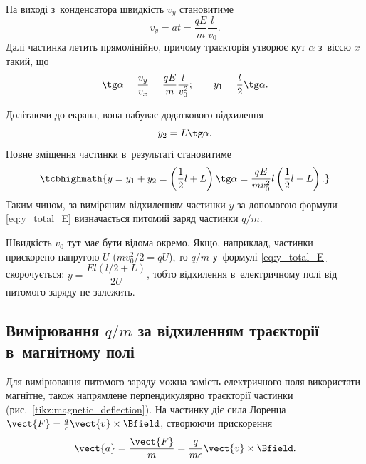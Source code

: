 На виході з~конденсатора швидкість $v_y$ становитиме
\begin{equation}\label{eq:vy_E}
	v_y = at = \frac{qE}{m}\frac{l}{v_0}.
\end{equation}
Далі частинка летить прямолінійно, причому траєкторія утворює кут $\alpha$ з~віссю $x$ такий, що
\begin{equation}\label{eq:tg_alpha}
	\tg\alpha = \frac{v_y}{v_x} = \frac{qE}{m}\frac{l}{v_0^2}; \qquad
	y_1 = \frac{l}{2}\tg\alpha.
\end{equation}

Долітаючи до екрана, вона набуває додаткового відхилення
\begin{equation}\label{eq:y2_E}
	y_2 = L \tg\alpha.
\end{equation}
Повне зміщення частинки в~результаті становитиме
\begin{equation}\label{eq:y_total_E}
	\tcbhighmath{
		y = y_1 + y_2 = \left(\frac{1}{2}l + L\right)\tg\alpha = \frac{qE}{mv_0^{2}}l\left(\frac{1}{2}l + L\right).
	}
\end{equation}
Таким чином, за виміряним відхиленням частинки $y$ за допомогою формули \eqref{eq:y_total_E} визначається питомий заряд частинки $q/m$.

Швидкість $v_0$ тут має бути відома окремо. Якщо, наприклад, частинки прискорено напругою $U$ ($mv_0^2/2 = qU$), то $q/m$ у~формулі \eqref{eq:y_total_E} скорочується: $y = \dfrac{El(l/2 + L)}{2U}$, тобто відхилення в~електричному полі від питомого заряду не залежить.


\subsection*{Вимірювання $q/m$ за відхиленням траєкторії в~магнітному полі}


Для вимірювання питомого заряду можна замість електричного поля використати магнітне, також напрямлене перпендикулярно траєкторії частинки (рис.~\ref{tikz:magnetic_deflection}). На частинку діє сила Лоренца $\vect{F} = \frac{q}{c}\vect{v} \times \Bfield$, створюючи прискорення
\begin{equation}\label{eq:a_B}
	\vect{a} = \frac{\vect{F}}{m} = \frac{q}{mc}\vect{v} \times \Bfield.
\end{equation}

